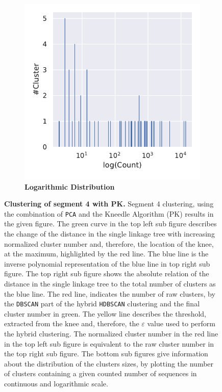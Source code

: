 \begin{figure}[!hbt]
\begin{subfigure}[b]{0.475\textwidth}
    \end{subfigure}
    \hfill
    \begin{subfigure}[b]{0.475\textwidth}
        \caption[Logarithmic Distribution]{\textbf{Logarithmic Distribution}}
        \label{subfig:PCA_Cluster_Knee_Distribution_log_4}            \includegraphics[width=\textwidth]{PCA/Cluster_Distribution_Log_Segment_4.pdf}
    \end{subfigure}
    \caption[Clustering of segment 4 with PK]{\textbf{Clustering of segment 4 with PK.} Segment 4 clustering, using the combination of \texttt{PCA} and the Kneedle Algorithm (PK) results in the given figure. The green curve in the top left sub figure describes the change of the distance in the single linkage tree with increasing normalized cluster number and, therefore, the location of the knee, at the maximum, highlighted by the red line. The blue line is the inverse polynomial representation of the blue line in top right sub figure. The top right sub figure shows the absolute relation of the distance in the single linkage tree to the total number of clusters as the blue line. The red line, indicates the number of raw clusters, by the \texttt{DBSCAN} part of the hybrid \texttt{HDBSCAN} clustering and the final cluster number in green. The yellow line describes the threshold, extracted from the knee and, therefore, the $\varepsilon$ value used to perform the hybrid clustering. The normalized cluster number in the red line in the top left sub figure is equivalent to the raw cluster number in the top right sub figure. The bottom sub figures give information about the distribution of the clusters sizes, by plotting the number of clusters containing a given counted number of sequences in continuous and logarithmic scale.}
    \label{fig:PCA_Cluster_Knee_4}
\end{figure}

